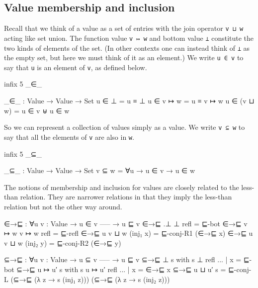 \hypertarget{value-membership-and-inclusion}{%
\subsection{Value membership and
inclusion}\label{value-membership-and-inclusion}}

Recall that we think of a value as a set of entries with the join
operator \texttt{v\ ⊔\ w} acting like set union. The function value
\texttt{v\ ↦\ w} and bottom value \texttt{⊥} constitute the two kinds of
elements of the set. (In other contexts one can instead think of
\texttt{⊥} as the empty set, but here we must think of it as an
element.) We write \texttt{u\ ∈\ v} to say that \texttt{u} is an element
of \texttt{v}, as defined below.

\begin{fence}
\begin{code}
infix 5 _∈_

_∈_ : Value → Value → Set
u ∈ ⊥ = u ≡ ⊥
u ∈ v ↦ w = u ≡ v ↦ w
u ∈ (v ⊔ w) = u ∈ v ⊎ u ∈ w
\end{code}
\end{fence}

So we can represent a collection of values simply as a value. We write
\texttt{v\ ⊆\ w} to say that all the elements of \texttt{v} are also in
\texttt{w}.

\begin{fence}
\begin{code}
infix 5 _⊆_

_⊆_ : Value → Value → Set
v ⊆ w = ∀{u} → u ∈ v → u ∈ w
\end{code}
\end{fence}

The notions of membership and inclusion for values are closely related
to the less-than relation. They are narrower relations in that they
imply the less-than relation but not the other way around.

\begin{fence}
\begin{code}
∈→⊑ : ∀{u v : Value}
    → u ∈ v
      -----
    → u ⊑ v
∈→⊑ {.⊥} {⊥} refl = ⊑-bot
∈→⊑ {v ↦ w} {v ↦ w} refl = ⊑-refl
∈→⊑ {u} {v ⊔ w} (inj₁ x) = ⊑-conj-R1 (∈→⊑ x)
∈→⊑ {u} {v ⊔ w} (inj₂ y) = ⊑-conj-R2 (∈→⊑ y)

⊆→⊑ : ∀{u v : Value}
    → u ⊆ v
      -----
    → u ⊑ v
⊆→⊑ {⊥} s with s {⊥} refl
... | x = ⊑-bot
⊆→⊑ {u ↦ u′} s with s {u ↦ u′} refl
... | x = ∈→⊑ x
⊆→⊑ {u ⊔ u′} s = ⊑-conj-L (⊆→⊑ (λ z → s (inj₁ z))) (⊆→⊑ (λ z → s (inj₂ z)))
\end{code}
\end{fence}

